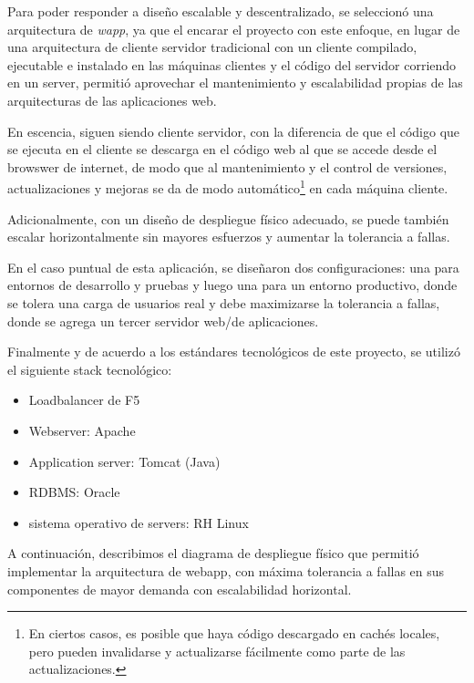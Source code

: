 Para poder responder a diseño escalable y descentralizado, se seleccionó una arquitectura de \emph{\Gls{wapp}}, ya que el encarar el proyecto con este enfoque, en lugar de una arquitectura de cliente servidor tradicional con un cliente compilado, ejecutable e instalado en las máquinas clientes y el código del servidor corriendo en un server, permitió aprovechar el mantenimiento y escalabilidad propias de las arquitecturas de las aplicaciones web. 

En escencia, siguen siendo cliente servidor, con la diferencia de que el código que se ejecuta en el cliente se descarga en el código web al que se accede desde el browswer de internet, de modo que al mantenimiento y el control de versiones, actualizaciones y mejoras se da de modo automático\footnote{En ciertos casos, es posible que haya código descargado en cachés locales, pero pueden invalidarse y actualizarse fácilmente como parte de las actualizaciones.} en cada máquina cliente.


Adicionalmente, con un diseño de despliegue físico adecuado, se puede también escalar horizontalmente sin mayores esfuerzos y aumentar la tolerancia a fallas.


En el caso puntual de esta aplicación, se diseñaron dos configuraciones: una para entornos de desarrollo y pruebas y luego una para un entorno productivo, donde se tolera una carga de usuarios real y debe maximizarse la tolerancia a fallas, donde se agrega un tercer servidor web/de aplicaciones.

\newpage 

Finalmente y de acuerdo a los estándares tecnológicos de este proyecto, se utilizó el siguiente stack tecnológico:

    \begin{itemize}
        \item Loadbalancer de F5
        \item Webserver: Apache
        \item Application server: Tomcat (Java)
        \item RDBMS: Oracle
        \item sistema operativo de servers: RH Linux
    \end{itemize}

A continuación, describimos el diagrama de despliegue físico que permitió implementar la arquitectura de webapp, con máxima tolerancia a fallas en sus componentes de mayor demanda con escalabilidad horizontal.

